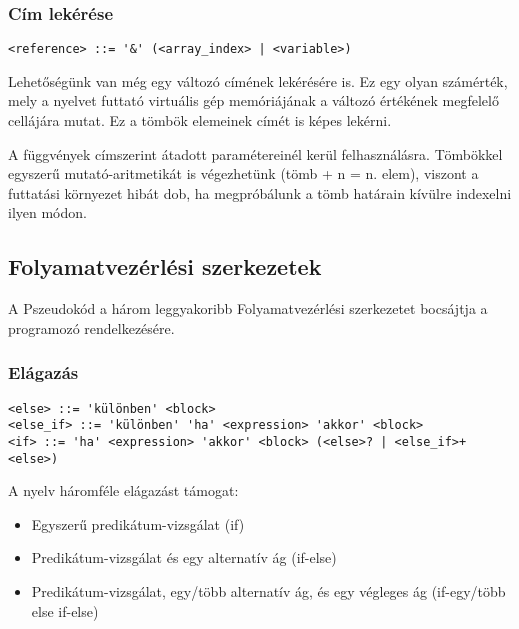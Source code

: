 \subsubsection{Cím lekérése}

\begin{footnotesize}
\begin{verbatim}
<reference> ::= '&' (<array_index> | <variable>)
\end{verbatim}
\end{footnotesize}

Lehetőségünk van még egy változó címének lekérésére is. Ez egy olyan számérték, mely a nyelvet futtató virtuális gép memóriájának a változó értékének megfelelő cellájára mutat. Ez a tömbök elemeinek címét is képes lekérni.

A függvények címszerint átadott paramétereinél kerül felhasználásra. Tömbökkel egyszerű mutató-aritmetikát is végezhetünk (tömb + n = n. elem), viszont a futtatási környezet hibát dob, ha megpróbálunk a tömb határain kívülre indexelni ilyen módon.

\subsection{Folyamatvezérlési szerkezetek}

A Pszeudokód a három leggyakoribb Folyamatvezérlési szerkezetet bocsájtja a programozó rendelkezésére.

\subsubsection{Elágazás}

\begin{footnotesize}
\begin{verbatim}
<else> ::= 'különben' <block>
<else_if> ::= 'különben' 'ha' <expression> 'akkor' <block>
<if> ::= 'ha' <expression> 'akkor' <block> (<else>? | <else_if>+ <else>)
\end{verbatim}
\end{footnotesize}

A nyelv háromféle elágazást támogat: 

\begin{itemize}
  \item Egyszerű predikátum-vizsgálat (if)
  \item Predikátum-vizsgálat és egy alternatív ág (if-else)
  \item Predikátum-vizsgálat, egy/több alternatív ág, és egy végleges ág (if-egy/több else if-else)
\end{itemize}

